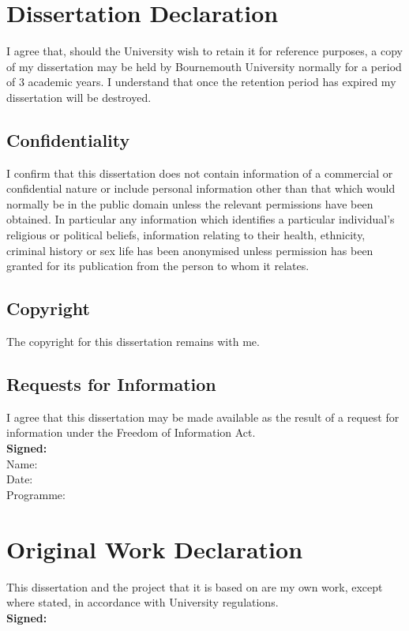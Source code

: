 \documentclass[11pt, twoside]{report}
\begin{document}
\chapter*{Dissertation Declaration}
{\linespread{1.0} %
I agree that, should the University wish to retain it for reference purposes, a copy of my dissertation may be held by Bournemouth University normally for a period of 3 academic years. I understand that once the retention period has expired my dissertation will be destroyed.

\section*{Confidentiality}
I confirm that this dissertation does not contain information of a commercial or confidential nature or include personal information other than that which would normally be in the public domain unless the relevant permissions have been obtained. In particular any information which identifies a particular individual's religious or political beliefs, information relating to their health, ethnicity, criminal history or sex life has been anonymised unless permission has been granted for its publication from the person to whom it relates.

\section*{Copyright}
The copyright for this dissertation remains with me.
 
\section*{Requests for Information}
I agree that this dissertation may be made available as the result of a request for information under the Freedom of Information Act.
\\ \newline
\textbf{Signed:}
\\
Name: 
\\
Date:
\\
Programme: 
}

\chapter*{Original Work Declaration}

This dissertation and the project that it is based on are my own work, except where stated, in accordance with University regulations.
\\ \newline
\textbf{Signed:}
\end{document}
